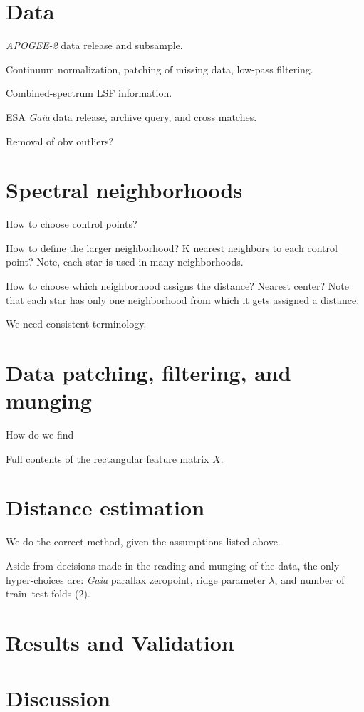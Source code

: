 \documentclass[modern]{aastex631}
\newcommand{\acronym}[1]{{\small{#1}}}
\newcommand{\project}[1]{\textsl{#1}}
\newcommand{\ESA}{\acronym{ESA}}
\newcommand{\Gaia}{\project{Gaia}}
\newcommand{\APOGEE}{\project{\acronym{APOGEE-2}}}
\begin{document}
\section{Data}

\APOGEE{} data release and subsample.

Continuum normalization, patching of missing data, low-pass filtering.

Combined-spectrum LSF information.

\ESA{} \Gaia{} data release, archive query, and cross matches.

Removal of obv outliers?

\section{Spectral neighborhoods}

How to choose control points?

How to define the larger neighborhood? K nearest neighbors to each control point? Note, each star is used in many neighborhoods.

How to choose which neighborhood assigns the distance? Nearest center? Note that each star has only one neighborhood from which it gets assigned a distance.

We need consistent terminology.

\section{Data patching, filtering, and munging}

How do we find 

Full contents of the rectangular feature matrix $X$.

\section{Distance estimation}

We do the correct method, given the assumptions listed above.

Aside from decisions made in the reading and munging of the data, the
only hyper-choices are: \Gaia{} parallax zeropoint, ridge parameter
$\lambda$, and number of train--test folds (2).

\section{Results and Validation}

\section{Discussion}
\end{document}
